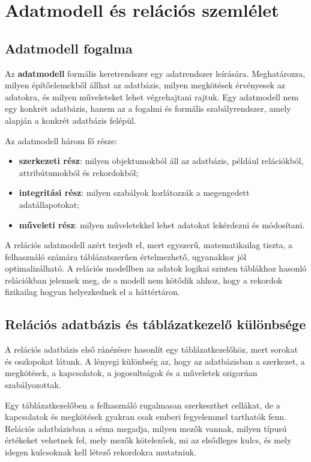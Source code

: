 

\section{Adatmodell és relációs szemlélet}

\subsection{Adatmodell fogalma}

Az \textbf{adatmodell} formális keretrendszer egy adatrendszer leírására. Meghatározza, milyen építőelemekből állhat az adatbázis, milyen megkötések érvényesek az adatokra, és milyen műveleteket lehet végrehajtani rajtuk. Egy adatmodell nem egy konkrét adatbázis, hanem az a fogalmi és formális szabályrendszer, amely alapján a konkrét adatbázis felépül.

Az adatmodell három fő része:

\begin{itemize}
  \item \textbf{szerkezeti rész}: milyen objektumokból áll az adatbázis, például relációkból, attribútumokból és rekordokból;
  \item \textbf{integritási rész}: milyen szabályok korlátozzák a megengedett adatállapotokat;
  \item \textbf{műveleti rész}: milyen műveletekkel lehet adatokat lekérdezni és módosítani.
\end{itemize}

A relációs adatmodell azért terjedt el, mert egyszerű, matematikailag tiszta, a felhasználó számára táblázatszerűen értelmezhető, ugyanakkor jól optimalizálható. A relációs modellben az adatok logikai szinten táblákhoz hasonló relációkban jelennek meg, de a modell nem kötődik ahhoz, hogy a rekordok fizikailag hogyan helyezkednek el a háttértáron.

\subsection{Relációs adatbázis és táblázatkezelő különbsége}

A relációs adatbázis első ránézésre hasonlít egy táblázatkezelőhöz, mert sorokat és oszlopokat látunk. A lényegi különbség az, hogy az adatbázisban a szerkezet, a megkötések, a kapcsolatok, a jogosultságok és a műveletek szigorúan szabályozottak.

Egy táblázatkezelőben a felhasználó rugalmasan szerkeszthet cellákat, de a kapcsolatok és megkötések gyakran csak emberi fegyelemmel tarthatók fenn. Relációs adatbázisban a séma megadja, milyen mezők vannak, milyen típusú értékeket vehetnek fel, mely mezők kötelezőek, mi az elsődleges kulcs, és mely idegen kulcsoknak kell létező rekordokra mutatniuk.

